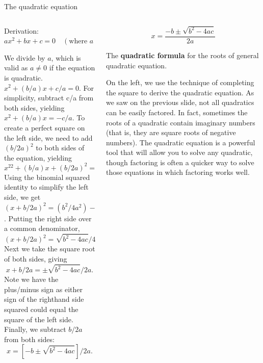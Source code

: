 \documentclass[9pt,aspectratio=169]{beamer}
\begin{document}
\begin{frame}{The quadratic equation}
  \begin{columns}[T]
    \begin{column}{0.55\textwidth}
      Derivation: $ax^2 + bx + c = 0 \quad (\text{where }a \neq 0).$

      We divide by $a$, which is valid as $a \neq 0$ if the equation is quadratic.
      $x^2 + (b/a)x + c/a = 0.$
      For simplicity, subtract c/a from both sides, yielding $x^2 + (b/a)x = -c/a$.  To create a perfect square on the left side, we need to add $(b/2a)^2$ to both sides of the equation, yielding 
      \[x^22 + (b/a)x + (b/2a)^2 = -c/a + (b/2a)^2.\]  
      Using the binomial squared identity to simplify the left side, we get $(x + b/2a)^2 = (b^2/4a^2) - c/a$.  Putting the right side over a common denominator, 
      \[ (x + b/2a)^2 = \sqrt{b^2 - 4ac}/4a^2.\]  
      Next we take the square root of both sides, giving
      \[ x + b/2a = \pm \sqrt{b^2 - 4ac}/2a.\]  
      Note we have the plus/minus sign as either sign of the righthand side squared could equal the square of the left side.  Finally, we subtract $b/2a$ from both sides:
	    \[ x = [-b \pm \sqrt{b^2 - 4ac}]/2a. \]
    \end{column}
    \begin{column}{0.45\textwidth}
      \begin{definition}
        \[ x = \frac{-b \pm \sqrt{b^2 - 4ac}}{2a} \]

        The \textbf{quadratic formula} for the roots of general quadratic equation.
      \end{definition}

      On the left, we use the technique of completing the square to derive the quadratic equation.  As we saw on the previous slide, not all quadratics can be easily factored.  In fact, sometimes the roots of a quadratic contain imaginary numbers (that is, they are square roots of negative numbers).  The quadratic equation is a powerful tool that will allow you to solve any quadratic, though factoring is often a quicker way to solve those equations in which factoring works well.

    \end{column}
  \end{columns}
\end{frame}
\end{document}
